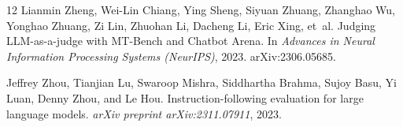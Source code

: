 \documentclass{article}
\begin{document}
\begin{thebibliography}{12}
Lianmin Zheng, Wei-Lin Chiang, Ying Sheng, Siyuan Zhuang, Zhanghao Wu, Yonghao
Zhuang, Zi Lin, Zhuohan Li, Dacheng Li, Eric Xing, et~al.
\newblock Judging {LLM}-as-a-judge with {MT-Bench} and {Chatbot Arena}.
\newblock In \emph{Advances in Neural Information Processing Systems (NeurIPS)}, 2023.
\newblock arXiv:2306.05685.

Jeffrey Zhou, Tianjian Lu, Swaroop Mishra, Siddhartha Brahma, Sujoy Basu, Yi Luan,
Denny Zhou, and Le Hou.
\newblock Instruction-following evaluation for large language models.
\newblock \emph{arXiv preprint arXiv:2311.07911}, 2023.

\end{thebibliography}
\end{document}
